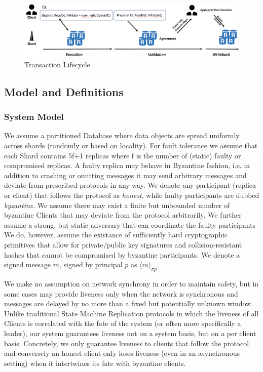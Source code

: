 \begin{figure}
\begin{center}
\includegraphics[width= \textwidth]{./figures/Architecture.png}
\end{center}
\caption{Transaction Lifecycle}
\label{fig:Figure1}
\end{figure}

\subsection{Model and Definitions}

\subsubsection{System Model}
We assume a partitioned Database where data objects are spread uniformly across shards (randomly or based on locality). For fault tolerance we assume that each Shard contains 5f+1 replicas where f is the number of (static) faulty or compromised replicas. A faulty replica may behave in Byzantine fashion, i.e. in addition to crashing or omitting messages it may send arbitrary messages and deviate from prescribed protocols in any way.
We denote any participant (replica or client) that follows the protocol as \textit{honest}, while faulty participants are dubbed \textit{byzantine}. We assume there may exist a finite but unbounded number of byzantine Clients that may deviate from the protocol arbitrarily. 
 We further assume a strong, but static adversary that can coordinate the faulty participants 
 We do, however, assume the existance of sufficiently hard cryptographic primitives that allow for private/public key signatures and collision-resistant hashes that cannot be compromised by byzantine participants. We denote a signed message $m$, signed by principal $p$ as $\langle m \rangle_{\sigma p}$.
 
We make no assumption on network synchrony in order to maintain safety, but in some cases may provide liveness  only when the network is synchronous and messages are delayed by no more than a fixed but potentially unknown window. Unlike traditional State Machine Replication protocols in which the liveness of all Clients is correlated with the fate of the system (or often more specifically a leader), our system guarantees liveness not on a system basis, but on a per client basis. Concretely, we only guarantee liveness to clients that follow the protocol and conversely an honest client only loses liveness (even in an asynchronous setting) when it intertwines its fate with byzantine clients.

